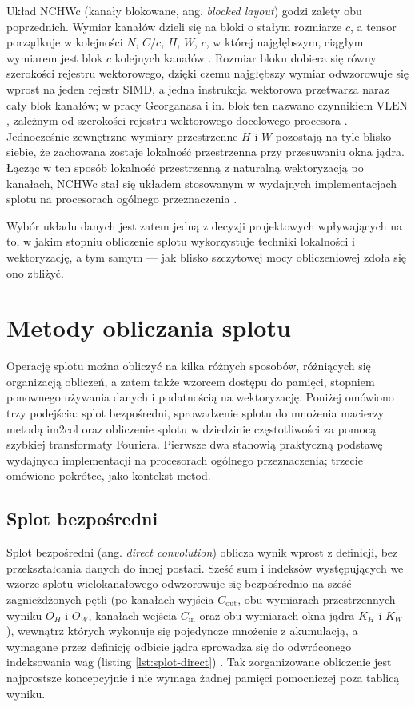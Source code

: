 \documentclass[a4paper,12pt]{book} %
\begin{document}
Układ NCHWc (kanały blokowane, ang. \emph{blocked layout}) godzi zalety obu poprzednich. Wymiar kanałów dzieli się na bloki o stałym rozmiarze $c$, a tensor porządkuje w kolejności $N$, $C/c$, $H$, $W$, $c$, w której najgłębszym, ciągłym wymiarem jest blok $c$ kolejnych kanałów \cite{onednn_memory_formats,georganas2018conv}. Rozmiar bloku dobiera się równy szerokości rejestru wektorowego, dzięki czemu najgłębszy wymiar odwzorowuje się wprost na jeden rejestr SIMD, a jedna instrukcja wektorowa przetwarza naraz cały blok kanałów; w pracy Georganasa i in. blok ten nazwano czynnikiem $\mathrm{VLEN}$, zależnym od szerokości rejestru wektorowego docelowego procesora \cite{georganas2018conv}. Jednocześnie zewnętrzne wymiary przestrzenne $H$ i $W$ pozostają na tyle blisko siebie, że zachowana zostaje lokalność przestrzenna przy przesuwaniu okna jądra. Łącząc w ten sposób lokalność przestrzenną z naturalną wektoryzacją po kanałach, NCHWc stał się układem stosowanym w wydajnych implementacjach splotu na procesorach ogólnego przeznaczenia \cite{onednn_memory_formats,georganas2018conv}.

Wybór układu danych jest zatem jedną z decyzji projektowych wpływających na to, w jakim stopniu obliczenie splotu wykorzystuje techniki lokalności i wektoryzację, a tym samym --- jak blisko szczytowej mocy obliczeniowej zdoła się ono zbliżyć.

\section{Metody obliczania splotu}
\label{sec:splot-metody}

Operację splotu można obliczyć na kilka różnych sposobów, różniących się organizacją obliczeń, a zatem także wzorcem dostępu do pamięci, stopniem ponownego używania danych i podatnością na wektoryzację. Poniżej omówiono trzy podejścia: splot bezpośredni, sprowadzenie splotu do mnożenia macierzy metodą im2col oraz obliczenie splotu w dziedzinie częstotliwości za pomocą szybkiej transformaty Fouriera. Pierwsze dwa stanowią praktyczną podstawę wydajnych implementacji na procesorach ogólnego przeznaczenia; trzecie omówiono pokrótce, jako kontekst metod.

\subsection{Splot bezpośredni}
\label{sec:splot-direct}

Splot bezpośredni (ang. \emph{direct convolution}) oblicza wynik wprost z definicji, bez przekształcania danych do innej postaci. Sześć sum i indeksów występujących we wzorze splotu wielokanałowego odwzorowuje się bezpośrednio na sześć zagnieżdżonych pętli (po kanałach wyjścia $C_{\mathrm{out}}$, obu wymiarach przestrzennych wyniku $O_H$ i $O_W$, kanałach wejścia $C_{\mathrm{in}}$ oraz obu wymiarach okna jądra $K_H$ i $K_W$), wewnątrz których wykonuje się pojedyncze mnożenie z akumulacją, a wymagane przez definicję odbicie jądra sprowadza się do odwróconego indeksowania wag (listing \ref{lst:splot-direct}) \cite{georganas2018conv}. Tak zorganizowane obliczenie jest najprostsze koncepcyjnie i nie wymaga żadnej pamięci pomocniczej poza tablicą wyniku.
\end{document}
